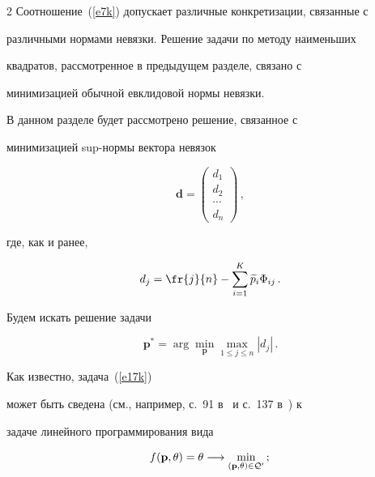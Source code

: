 \begin{multicols}{2}
Соотношение~(\ref{e7k}) допускает различные конкретизации, связанные с


различными нормами невязки. Решение задачи по методу наименьших


квадратов, рассмотренное в предыдущем разделе, связано с


минимизацией обычной евклидовой нормы невязки.





В данном разделе будет рассмотрено решение, связанное с


минимизацией sup-нормы вектора невязок


$$


{\mathbf d}=


\begin{pmatrix}


d_1\\[3pt]


d_2\\[3pt]


\cdots\\[3pt]


d_n \end{pmatrix}\,,


$$


где, как и ранее,


$$


d_j=\fr{j}{n}-\sum_{i=1}^K\widetilde p_i\Phi_{ij}\,.


$$


Будем искать решение задачи


\begin{equation}


{\mathbf p}^*=\arg\min_{\mathbf


p}\max_{1\le j\le n}|d_j|\,.


\label{e17k}


\end{equation}


Как известно, задача~(\ref{e17k})


может быть сведена (см., например, с.~91 в~\cite{7k} и с.~137 в~\cite{8k}) к


задаче линейного программирования вида


\begin{equation}


f({\mathbf p},\theta)=\theta\longrightarrow\min_{({\mathbf


p},\theta)\in{\mathcal Q'}}\,;


\label{e18k}\\



\end{equation}
\end{multicols}
